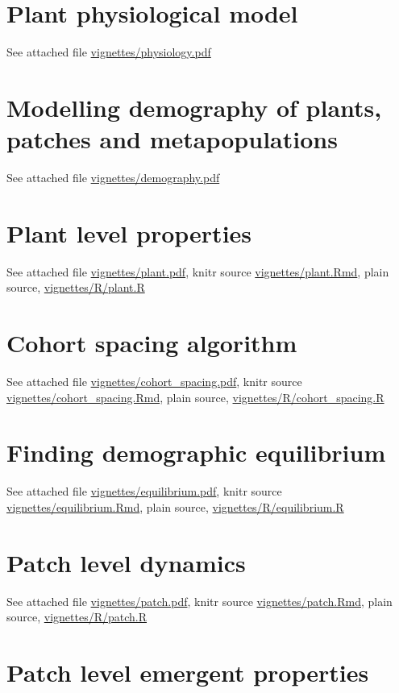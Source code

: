 \documentclass[a4paper,11pt]{article}
\begin{document}
\begin{appendices}\label{sec:appendices}

\section{Plant physiological model}\label{sec:FFW16}

See attached file \url{vignettes/physiology.pdf}

\section{Modelling demography of plants, patches and metapopulations}\label{sec:demography}

See attached file \url{vignettes/demography.pdf}

\section{Plant level properties}\label{sec:plant}

See attached file \url{vignettes/plant.pdf}, knitr source
\url{vignettes/plant.Rmd}, plain source, \url{vignettes/R/plant.R}

\section{Cohort spacing algorithm}\label{sec:cohort-spacing}

See attached file \url{vignettes/cohort_spacing.pdf}, knitr source
\url{vignettes/cohort_spacing.Rmd}, plain source, \url{vignettes/R/cohort_spacing.R}

\section{Finding demographic equilibrium}\label{sec:equilibrium}

See attached file \url{vignettes/equilibrium.pdf}, knitr source
\url{vignettes/equilibrium.Rmd}, plain source, \url{vignettes/R/equilibrium.R}

\section{Patch level dynamics}\label{sec:patch}

See attached file \url{vignettes/patch.pdf}, knitr source
\url{vignettes/patch.Rmd}, plain source, \url{vignettes/R/patch.R}

\section{Patch level emergent properties}\label{sec:emergent}


\end{appendices}
\end{document}

